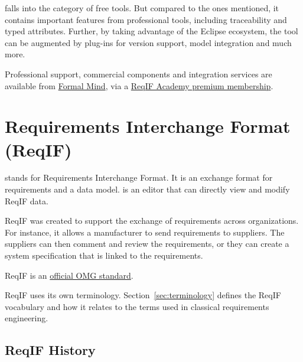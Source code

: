 \pror{} falls into the category of free tools.  But compared to the ones mentioned, it contains important features from professional tools, including traceability and typed attributes.  Further, by taking advantage of the Eclipse ecosystem, the tool can be augmented by plug-ins for version support, model integration and much more.

\begin{info}
  Professional support, commercial components and integration services are available from \href{http://formalmind.com}{Formal Mind}, via a \href{https://reqif.academy}{ReqIF Academy premium membership}.
\end{info}

\section{Requirements Interchange Format (ReqIF)}
\label{sec:reqif}

 stands for Requirements Interchange Format.  It is an exchange format for requirements and a data model.  \pror{} is an editor that can directly view and modify ReqIF data.

ReqIF was created to support the exchange of requirements across organizations.  For instance, it allows a manufacturer to send requirements to suppliers.  The suppliers can then comment and review the requirements, or they can create a system specification that is linked to the requirements.

ReqIF is an \href{http://www.omg.org/spec/ReqIF/}{official OMG standard}.

\begin{warning}
ReqIF uses its own terminology.  Section~\ref{sec:terminology} defines the ReqIF vocabulary and how it relates to the terms used in classical requirements engineering.
\end{warning}

\subsection{ReqIF History}
\label{sec:history}


